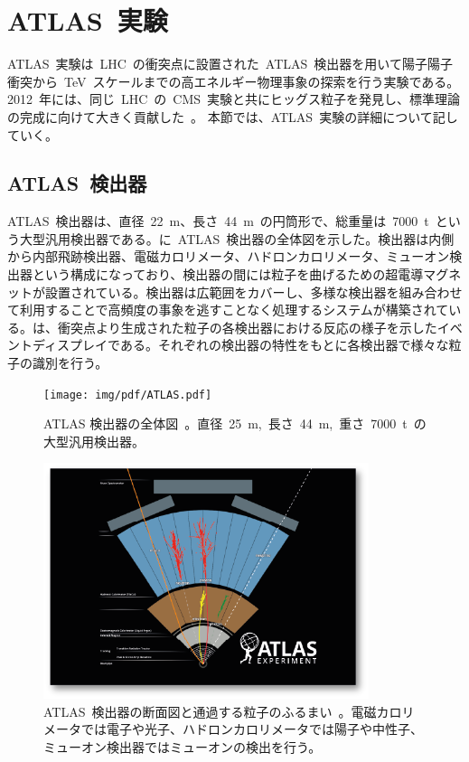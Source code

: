 \section{ATLAS~実験}
ATLAS~実験は~LHC~の衝突点に設置された~ATLAS~検出器を用いて陽子陽子衝突から~TeV~スケールまでの高エネルギー物理事象の探索を行う実験である。2012~年には、同じ~LHC~の~CMS~実験と共にヒッグス粒子を発見し、標準理論の完成に向けて大きく貢献した~\cite{TR:03,TR:03a}。
本節では、ATLAS~実験の詳細について記していく。
\subsection{ATLAS~検出器}
ATLAS~検出器は、直径~22~m、長さ~44~m~の円筒形で、総重量は~7000~t~という大型汎用検出器である。に~ATLAS~検出器の全体図を示した。検出器は内側から内部飛跡検出器、電磁カロリメータ、ハドロンカロリメータ、ミューオン検出器という構成になっており、検出器の間には粒子を曲げるための超電導マグネットが設置されている。検出器は広範囲をカバーし、多様な検出器を組み合わせて利用することで高頻度の事象を逃すことなく処理するシステムが構築されている。は、衝突点より生成された粒子の各検出器における反応の様子を示したイベントディスプレイである。それぞれの検出器の特性をもとに各検出器で様々な粒子の識別を行う。

\begin{figure}[H]
    \centering   
    \texttt{[image: img/pdf/ATLAS.pdf]}
    \caption[ATLAS 検出器の全体図]{ATLAS 検出器の全体図~\cite{TR:01}。直径~25~m,~長さ~44~m,~重さ~7000~t~の大型汎用検出器。}\label{fig:atlasdet}
\end{figure}

\begin{figure}[htbp]
    \centering   
    \includegraphics[width=0.85\textwidth]{img/jpeg/how.png}
    \caption[ATLAS~検出器の断面図と通過する粒子のふるまい]{ATLAS~検出器の断面図と通過する粒子のふるまい~\cite{URL:02}。電磁カロリメータでは電子や光子、ハドロンカロリメータでは陽子や中性子、ミューオン検出器ではミューオンの検出を行う。}
    \label{fig:disp}
\end{figure}

